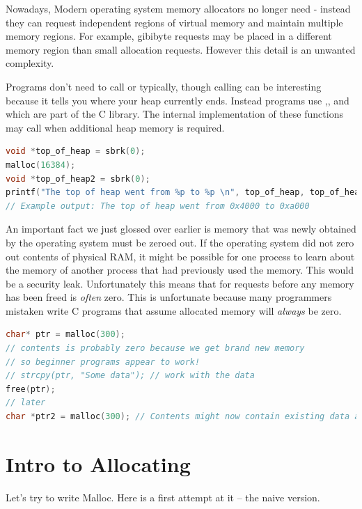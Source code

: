 Nowadays, Modern operating system memory allocators no longer need  - instead they can request independent regions of virtual memory and maintain multiple memory regions.
For example, gibibyte requests may be placed in a different memory region than small allocation requests.
However this detail is an unwanted complexity.

Programs don't need to call  or  typically, though calling  can be interesting because it tells you where your heap currently ends.
Instead programs use ,, and  which are part of the C library.
The internal implementation of these functions may call  when additional heap memory is required.

\begin{lstlisting}[language=C]
void *top_of_heap = sbrk(0);
malloc(16384);
void *top_of_heap2 = sbrk(0);
printf("The top of heap went from %p to %p \n", top_of_heap, top_of_heap2);
// Example output: The top of heap went from 0x4000 to 0xa000
\end{lstlisting}

An important fact we just glossed over earlier is memory that was newly obtained by the operating system must be zeroed out.
If the operating system did not zero out contents of physical RAM, it might be possible for one process to learn about the memory of another process that had previously used the memory.
This would be a security leak.
Unfortunately this means that for  requests before any memory has been freed is \emph{often} zero.
This is unfortunate because many programmers mistaken write C programs that assume allocated memory will \emph{always} be zero.

\begin{lstlisting}[language=C]
char* ptr = malloc(300);
// contents is probably zero because we get brand new memory
// so beginner programs appear to work!
// strcpy(ptr, "Some data"); // work with the data
free(ptr);
// later
char *ptr2 = malloc(300); // Contents might now contain existing data and is probably not zero
\end{lstlisting}

\section{Intro to Allocating}

Let's try to write Malloc.
Here is a first attempt at it -- the naive version.

